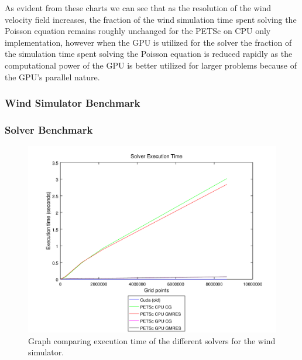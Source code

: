 As evident from these charts we can see that as the resolution of the wind
velocity field increases, the fraction of the wind simulation time spent solving
the Poisson equation remains roughly unchanged for the PETSc on CPU only
implementation, however when the GPU is utilized for the solver the fraction of
the simulation time spent solving the Poisson equation is reduced rapidly as
the computational power of the GPU is better utilized for larger problems because
of the GPU's parallel nature.

\subsubsection{Wind Simulator Benchmark}


\subsubsection{Solver Benchmark}



\begin{figure}[ht]
	\center
	\includegraphics[width=1.0\textwidth]{results/data/sb/exec_time_all}
	\caption{Graph comparing execution time of the different solvers for the
		wind simulator.}
	\label{fig:sb_exec_time_all}
\end{figure}

